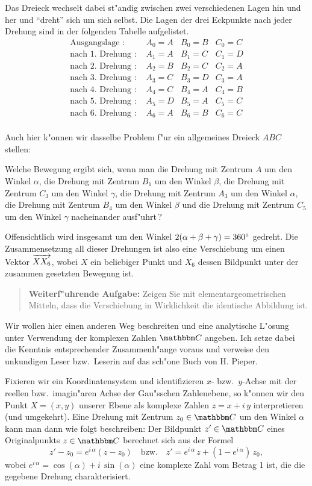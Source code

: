 \documentclass[11pt]{article}
\begin{document}
Das Dreieck wechselt dabei st"andig zwischen zwei verschiedenen Lagen hin und
her und ``dreht'' sich um sich selbst.  Die Lagen der drei Eckpunkte nach
jeder Drehung sind in der folgenden Tabelle aufgelistet.
\[\begin{array}{lccc}
\mbox{Ausgangslage : } & A_0=A & B_0=B & C_0=C\\
\mbox{nach 1. Drehung : } & A_1=A & B_1=C & C_1=D\\
\mbox{nach 2. Drehung : } & A_2=B & B_2=C & C_2=A\\
\mbox{nach 3. Drehung : } & A_3=C & B_3=D & C_3=A\\
\mbox{nach 4. Drehung : } & A_4=C & B_4=A & C_4=B\\
\mbox{nach 5. Drehung : } & A_5=D & B_5=A & C_5=C\\
\mbox{nach 6. Drehung : } & A_6=A & B_6=B & C_6=C\\
\end{array}\]

Auch hier k"onnen wir dasselbe Problem f"ur ein allgemeines Dreieck
$ABC$ stellen:
\begin{aufgabe}
  Welche Bewegung ergibt sich, wenn man die Drehung mit Zentrum $A$ um den
  Winkel $\alpha$, die Drehung mit Zentrum $B_1$ um den Winkel $\beta$, die
  Drehung mit Zentrum $C_3$ um den Winkel $\gamma$, die Drehung mit Zentrum
  $A_3$ um den Winkel $\alpha$, die Drehung mit Zentrum $B_4$ um den Winkel
  $\beta$ und die Drehung mit Zentrum $C_5$ um den Winkel $\gamma$
  nacheinander ausf"uhrt\,?
\end{aufgabe}

Offensichtlich wird insgesamt um den Winkel $2(\alpha+\beta+\gamma) =360^{\circ}$
gedreht. Die Zusammensetzung all dieser Drehungen ist also eine Verschiebung
um einen Vektor $\kvector{XX_6}$, wobei $X$ ein beliebiger Punkt und $X_6$
dessen Bildpunkt unter der zusammen gesetzten Bewegung ist.
\begin{quote}
  {\bf Weiterf"uhrende Aufgabe:} Zeigen Sie mit elementargeometrischen
  Mitteln, dass die Verschiebung in Wirklichkeit die identische Abbildung ist.
\end{quote}

Wir wollen hier einen anderen Weg beschreiten und eine analytische L"osung
unter Verwendung der komplexen Zahlen ${\C}$ angeben. Ich setze dabei die
Kenntnis entsprechender Zusammenh"ange voraus und verweise den unkundigen
Leser bzw.\ Leserin auf das sch"one Buch \cite{Pieper} von H. Pieper.

Fixieren wir ein Koordinatensystem und identifizieren $x$- bzw.\ $y$-Achse mit
der reellen bzw.\ imagin"aren Achse der Gau"sschen Zahlenebene, so k"onnen wir
den Punkt $X=(x,y)$ unserer Ebene als komplexe Zahlen $z=x+i\,y$
interpretieren (und umgekehrt). Eine Drehung mit Zentrum $z_0\in {\C}$ um den
Winkel $\alpha$ kann man dann wie folgt beschreiben: Der Bildpunkt $z'\in
{\C}$ eines Originalpunkts $z\in {\C}$ berechnet sich aus der Formel
\[z'-z_0=e^{i\,\alpha}(z-z_0)\quad\text{bzw.}\quad z'=e^{i\,\alpha}\,z
+ (1-e^{i\,\alpha})\,z_0,\]
wobei $e^{i\,\alpha}=\cos(\alpha)+i\,\sin(\alpha)$ eine komplexe Zahl
vom Betrag 1 ist, die die gegebene Drehung charakterisiert. 
\end{document}
